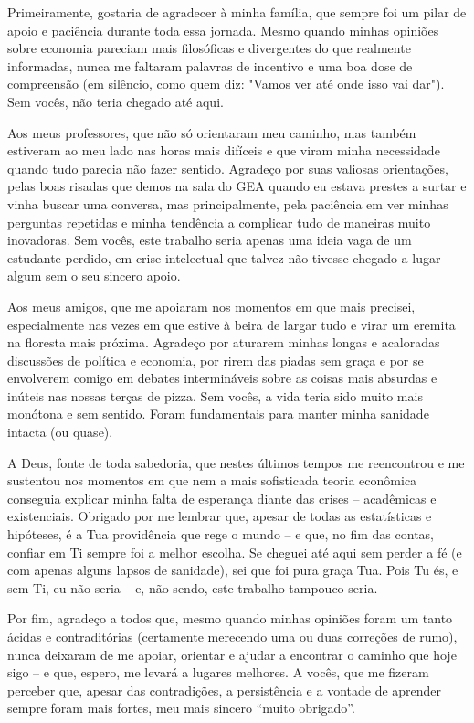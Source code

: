 \begin{agradecimentos}
    Primeiramente, gostaria de agradecer à minha família, que sempre foi um pilar de apoio e paciência durante toda essa jornada. Mesmo quando minhas opiniões sobre economia pareciam mais filosóficas e divergentes do que realmente informadas, nunca me faltaram palavras de incentivo e uma boa dose de compreensão (em silêncio, como quem diz: "Vamos ver até onde isso vai dar"). Sem vocês, não teria chegado até aqui.

    Aos meus professores, que não só orientaram meu caminho, mas também estiveram ao meu lado nas horas mais difíceis e que viram minha necessidade quando tudo parecia não fazer sentido. Agradeço por suas valiosas orientações, pelas boas risadas que demos na sala do GEA quando eu estava prestes a surtar e vinha buscar uma conversa, mas principalmente, pela paciência em ver minhas perguntas repetidas e minha tendência a complicar tudo de maneiras muito inovadoras. Sem vocês, este trabalho seria apenas uma ideia vaga de um estudante perdido, em crise intelectual que talvez não tivesse chegado a lugar algum sem o seu sincero apoio.
    
    Aos meus amigos, que me apoiaram nos momentos em que mais precisei, especialmente nas vezes em que estive à beira de largar tudo e virar um eremita na floresta mais próxima. Agradeço por aturarem minhas longas e acaloradas discussões de política e economia, por rirem das piadas sem graça e por se envolverem comigo em debates intermináveis sobre as coisas mais absurdas e inúteis nas nossas terças de pizza. Sem vocês, a vida teria sido muito mais monótona e sem sentido. Foram fundamentais para manter minha sanidade intacta (ou quase).

    A Deus, fonte de toda sabedoria, que nestes últimos tempos me reencontrou e me sustentou nos momentos em que nem a mais sofisticada teoria econômica conseguia explicar minha falta de esperança diante das crises – acadêmicas e existenciais. Obrigado por me lembrar que, apesar de todas as estatísticas e hipóteses, é a Tua providência que rege o mundo – e que, no fim das contas, confiar em Ti sempre foi a melhor escolha. Se cheguei até aqui sem perder a fé (e com apenas alguns lapsos de sanidade), sei que foi pura graça Tua. Pois Tu és, e sem Ti, eu não seria – e, não sendo, este trabalho tampouco seria.

    Por fim, agradeço a todos que, mesmo quando minhas opiniões foram um tanto ácidas e contraditórias (certamente merecendo uma ou duas correções de rumo), nunca deixaram de me apoiar, orientar e ajudar a encontrar o caminho que hoje sigo – e que, espero, me levará a lugares melhores. A vocês, que me fizeram perceber que, apesar das contradições, a persistência e a vontade de aprender sempre foram mais fortes, meu mais sincero “muito obrigado”.


\end{agradecimentos}
